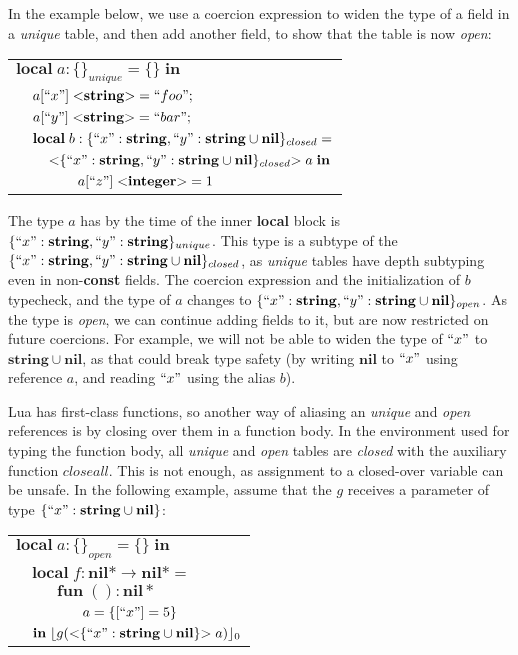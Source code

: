 \documentclass[preprint]{sigplanconf}
\newcommand{\Nil}{\mathbf{nil}}
\newcommand{\Integer}{\mathbf{integer}}
\newcommand{\String}{\mathbf{string}}
\newcommand{\Void}{\Nil{*}}
\begin{document}
In the example below, we use a coercion expression to
widen the type of a field in a {\em unique}
table, and then add another field, to show that the
table is now {\em open}:
\begin{center}
\begin{tabular}{llll}
\multicolumn{4}{l}{$\mathbf{local} \; a:\{\}_{unique} = \{ \} \; \mathbf{in}$}\\
& \multicolumn{3}{l}{$a[``x"] \; {<}\String{>} = ``foo";$}\\
& \multicolumn{3}{l}{$a[``y"] \; {<}\String{>} = ``bar";$}\\
& \multicolumn{3}{l}{$\mathbf{local} \; b:\{``x":\String, ``y":\String \cup \Nil \}_{closed} =$}\\
& & \multicolumn{2}{l}{${<}\{``x":\String, ``y":\String \cup \Nil\}_{closed}{>} \; a \; \mathbf{in}$}\\
& & & \multicolumn{1}{l}{$a[``z"] \; {<}\Integer{>} = 1$}
\end{tabular}
\end{center}

The type $a$ has by the time of the inner {\bf local} block
is $\{``x":\String, ``y":\String\}_{unique}$. This type is
a subtype of the $\{``x":\String, ``y":\String\cup\Nil\}_{closed}$, as {\em unique} tables
have depth subtyping even in non-{\bf const} fields.
The coercion expression and the initialization of $b$
typecheck, and the type of $a$ changes to
$\{``x":\String, ``y":\String\cup\Nil\}_{open}$.
As the type is {\em open}, we can continue adding fields
to it, but are now restricted on future coercions. For
example, we will not be able to widen the type of $``x"$
to $\String \cup \Nil$, as that could break type safety
(by writing $\Nil$ to $``x"$ using reference $a$, and reading
$``x"$ using the alias $b$).

Lua has first-class functions, so another way of aliasing
an {\em unique} and {\em open} references is by closing
over them in a function body. In the environment used for
typing the function body, all {\em unique} and {\em open}
tables are {\em closed} with the auxiliary function $closeall$.
This is not enough, as assignment
to a closed-over variable can be unsafe. In the following
example, assume that the $g$ receives a parameter of type
$\{ ``x": \String \cup \Nil\}$:
\begin{center}
	\begin{tabular}{llll}
		\multicolumn{4}{l}{$\mathbf{local} \; a:\{\}_{open}
			= \{\} \; \mathbf{in}$}\\
		& \multicolumn{3}{l}{$\mathbf{local} \; f:\Void \rightarrow \Void =$}\\
		& & \multicolumn{2}{l}{$\mathbf{fun} \; ():\Void$}\\
		& & & \multicolumn{1}{l}{$a = \{[``x"]=5\} $}\\
		& \multicolumn{3}{l}{$\mathbf{in} \; \lfloor g({<}\{``x":
			 \String \cup \Nil\}{>} \; a) \rfloor_{0}$}
	\end{tabular}
\end{center}
\end{document}

